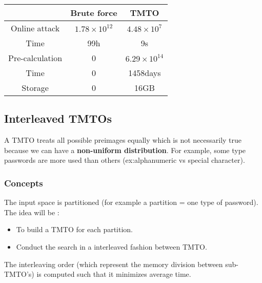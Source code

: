\begin{center}
\begin{tabular}{|c|c|c|}
    \hline
    & \textbf{Brute force} & \textbf{TMTO} \\
    \hline
    Online attack & $1.78 \times 10^{12}$ &  $4.48 \times 10^7$\\
    Time & 99h & 9s\\
    \hline
    Pre-calculation & 0 & $6.29 \times 10^{14}$\\
    Time & 0 & 1458days \\
    Storage & 0 & 16GB \\
    \hline
\end{tabular}
\end{center}

\subsection{Interleaved TMTOs}
A TMTO treats all possible preimages equally which is not necessarily
true because we can have a \textbf{non-uniform distribution}. For
example, some type passwords are more used than others
(ex:alphanumeric vs special character).

\subsubsection{Concepts}
The input space is partitioned (for example a partition = one type of password).
The idea will be :
\begin{itemize}
	\item To build a TMTO for each partition.
	\item Conduct the search in a interleaved fashion between TMTO.
\end{itemize}

The interleaving order (which represent the memory division between
sub-TMTO's) is computed such that it minimizes average time.

